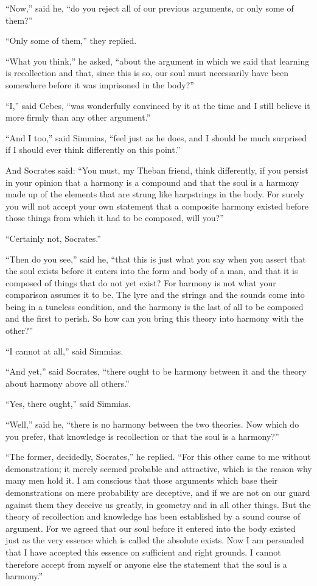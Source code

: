 \documentclass[letterpaper,12pt]{article}
\newcommand{\stephpag}[1]{\marginnote{\small\itshape\fontfamily{ppl}\selectfont #1}}
\begin{document}
\begin{drama}
``Now,'' said he, ``do you reject all of our previous arguments, or only some of them?''
 
``Only some of them,'' they replied.
 
``What you think,'' he asked, ``about the argument in which we said that learning is recollection and that, since this is so, our soul must necessarily have been somewhere \stephpag{92 a} before it was imprisoned in the body?''
 
``I,'' said Cebes, ``was wonderfully convinced by it at the time and I still believe it more firmly than any other argument.''
 
``And I too,'' said Simmias, ``feel just as he does, and I should be much surprised if I should ever think differently on this point.''
 
And Socrates said: ``You must, my Theban friend, think differently, if you persist in your opinion that a harmony is a compound and that the soul is a harmony made up of the elements that are strung like harpstrings in the body. \stephpag{b} For surely you will not accept your own statement that a composite harmony existed before those things from which it had to be composed, will you?''
 
``Certainly not, Socrates.''
 
``Then do you see,'' said he, ``that this is just what you say when you assert that the soul exists before it enters into the form and body of a man, and that it is composed of things that do not yet exist? For harmony is not what your comparison assumes it to be. The lyre and the strings and the sounds \stephpag{c} come into being in a tuneless condition, and the harmony is the last of all to be composed and the first to perish. So how can you bring this theory into harmony with the other?''
 
``I cannot at all,'' said Simmias.
 
``And yet,'' said Socrates, ``there ought to be harmony between it and the theory about harmony above all others.''
 
``Yes, there ought,'' said Simmias.
 
``Well,'' said he, ``there is no harmony between the two theories. Now which do you prefer, that knowledge is recollection or that the soul is a harmony?''
 
``The former, decidedly, Socrates,'' he replied. ``For this other came to me without demonstration; it merely seemed probable \stephpag{d} and attractive, which is the reason why many men hold it. I am conscious that those arguments which base their demonstrations on mere probability are deceptive, and if we are not on our guard against them they deceive us greatly, in geometry and in all other things. But the theory of recollection and knowledge has been established by a sound course of argument. For we agreed that our soul before it entered into the body existed just as the very essence which is called the absolute exists. \stephpag{e} Now I am persuaded that I have accepted this essence on sufficient and right grounds. I cannot therefore accept from myself or anyone else the statement that the soul is a harmony.''
 

\end{drama}
\end{document}
